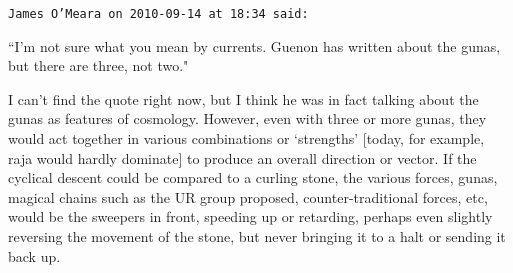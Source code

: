 \begin{footnotesize}
\begin{sffamily}
\hfill

\texttt{James O'Meara on 2010-09-14 at 18:34 said: }

``I'm not sure what you mean by currents. Guenon has written about the gunas, but there are three, not two."

I can't find the quote right now, but I think he was in fact talking about the gunas as features of cosmology. However, even with three or more gunas, they would act together in various combinations or `strengths’ [today, for example, raja would hardly dominate] to produce an overall direction or vector. If the cyclical descent could be compared to a curling stone, the various forces, gunas, magical chains such as the UR group proposed, counter-traditional forces, etc, would be the sweepers in front, speeding up or retarding, perhaps even slightly reversing the movement of the stone, but never bringing it to a halt or sending it back up.


\end{sffamily}\end{footnotesize}
